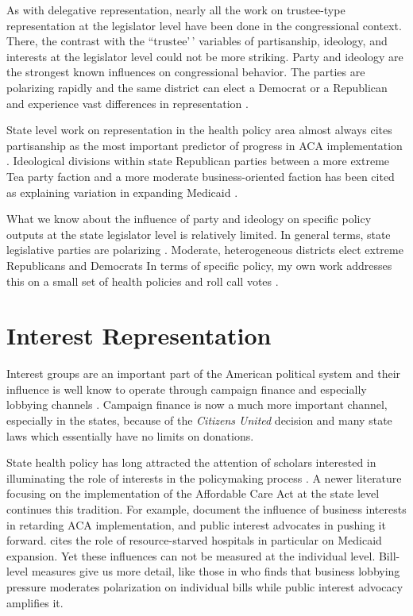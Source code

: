 \documentclass[
  oneside]{book}
\begin{document}
As with delegative representation, nearly all the work on trustee-type representation at the legislator level have been done in the congressional context. There, the contrast with the ``trustee'\,' variables of partisanship, ideology, and interests at the legislator level could not be more striking. Party \citep{Lee:2009, Lee:2016} and ideology \citep{Poole:2007a} are the strongest known influences on congressional behavior. The parties are polarizing rapidly \citep{Barber:2015} and the same district can elect a Democrat or a Republican and experience vast differences in representation \citep{McCarty:2009}.

State level work on representation in the health policy area almost always cites partisanship as the most important predictor of progress in ACA implementation \citep{Rigby:2013, Jacobs:2013, Jones:2014, Barrilleaux:2014, Haeder:2015, Callaghan:2016, Callaghan:2017}. Ideological divisions within state Republican parties between a more extreme Tea party faction and a more moderate business-oriented faction has been cited as explaining variation in expanding Medicaid \citep{Hertel-Fernandez:2016}.

What we know about the influence of party and ideology on specific policy outputs at the state legislator level is relatively limited. In general terms, state legislative parties are polarizing \citep{Shor:2011, Shor:2020}. Moderate, heterogeneous districts elect extreme Republicans and Democrats \citep{Rodden:2018} In terms of specific policy, my own work addresses this on a small set of health policies and roll call votes \citep{Shor:2018}.

\hypertarget{interest-representation}{%
\section{Interest Representation}\label{interest-representation}}

Interest groups are an important part of the American political system and their influence is well know to operate through campaign finance and especially lobbying channels \citep{Hall:1990, Evans:1996}. Campaign finance is now a much more important channel, especially in the states, because of the \emph{Citizens United} decision and many state laws which essentially have no limits on donations.

State health policy has long attracted the attention of scholars interested in illuminating the role of interests in the policymaking process \citep{Lowery:2008, Gray:2013}. A newer literature focusing on the implementation of the Affordable Care Act at the state level continues this tradition. For example, \citet{Callaghan:2016} document the influence of business interests in retarding ACA implementation, and public interest advocates in pushing it forward. \citet{Rose:2015} cites the role of resource-starved hospitals in particular on Medicaid expansion. Yet these influences can not be measured at the individual level. Bill-level measures give us more detail, like those in \citet{Garlick:2016} who finds that business lobbying pressure moderates polarization on individual bills while public interest advocacy amplifies it.
\end{document}
